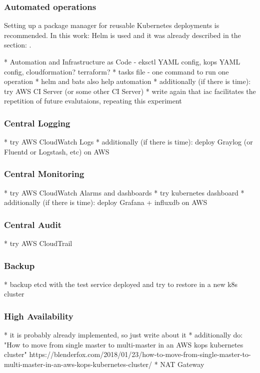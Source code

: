 \subsubsection{Automated operations}

Setting up a package manager for reusable Kubernetes deployments is recommended\cite{gruntwork-howto-blog}. In this work: Helm is used and it was already described in the section: .

* Automation and Infrastructure as Code - eksctl YAML config, kops YAML config, cloudformation? terraform?
* tasks file - one command to run one operation
* helm and bats also help automation
* additionally (if there is time): try AWS CI Server (or some other CI Server)
* write again that iac facilitates the repetition of future evalutaions, repeating this experiment

\subsubsection{Central Logging}

* try AWS CloudWatch Logs
* additionally (if there is time): deploy Graylog (or Fluentd or Logstash, etc) on AWS

\subsubsection{Central Monitoring}

* try AWS CloudWatch Alarms and dashboards
* try kubernetes dashboard
* additionally (if there is time): deploy Grafana + influxdb on AWS

\subsubsection{Central Audit}

* try AWS CloudTrail

\subsubsection{Backup}

* backup etcd with the test service deployed and try to restore in a new k8s cluster

\subsubsection{High Availability}

* it is probably already implemented, so just write about it
* additionally do: "How to move from single master to multi-master in an AWS kops kubernetes cluster" https://blenderfox.com/2018/01/23/how-to-move-from-single-master-to-multi-master-in-an-aws-kops-kubernetes-cluster/
* NAT Gateway


